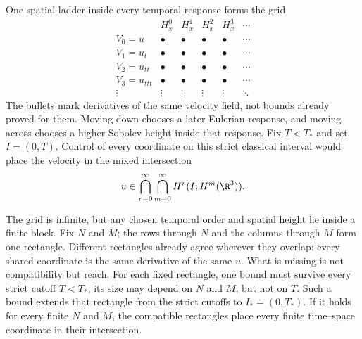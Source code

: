 One spatial ladder inside every temporal response forms the grid
{\small
\[
\begin{array}{c|ccccc}
 & H^0_x & H^1_x & H^2_x & H^3_x & \cdots\\
\hline
V_0=u      & \bullet & \bullet & \bullet & \bullet & \cdots\\
V_1=u_t    & \bullet & \bullet & \bullet & \bullet & \cdots\\
V_2=u_{tt} & \bullet & \bullet & \bullet & \bullet & \cdots\\
V_3=u_{ttt}& \bullet & \bullet & \bullet & \bullet & \cdots\\
\vdots     & \vdots  & \vdots  & \vdots  & \vdots  & \ddots
\end{array}
\]
}
The bullets mark derivatives of the same velocity field, not bounds already proved for them.
Moving down chooses a later Eulerian response, and moving across chooses a higher Sobolev height inside that response.
Fix \(T<T_*\) and set \(I=(0,T)\).
Control of every coordinate on this strict classical interval would place the velocity in the mixed intersection
\begin{equation}\label{eq:BodyDesiredMixedIntersection}
  u\in
  \bigcap_{r=0}^{\infty}
  \bigcap_{m=0}^{\infty}
  H^r(I;H^m(\R^3)).
\end{equation}

The grid is infinite, but any chosen temporal order and spatial height lie inside a finite block.
Fix \(N\) and \(M\); the rows through \(N\) and the columns through \(M\) form one rectangle.
Different rectangles already agree wherever they overlap: every shared coordinate is the same derivative of the same \(u\).
What is missing is not compatibility but reach.
For each fixed rectangle, one bound must survive every strict cutoff \(T<T_*\); its size may depend on \(N\) and \(M\), but not on \(T\).
Such a bound extends that rectangle from the strict cutoffs to \(I_*=(0,T_*)\).
If it holds for every finite \(N\) and \(M\), the compatible rectangles place every finite time--space coordinate in their intersection.
